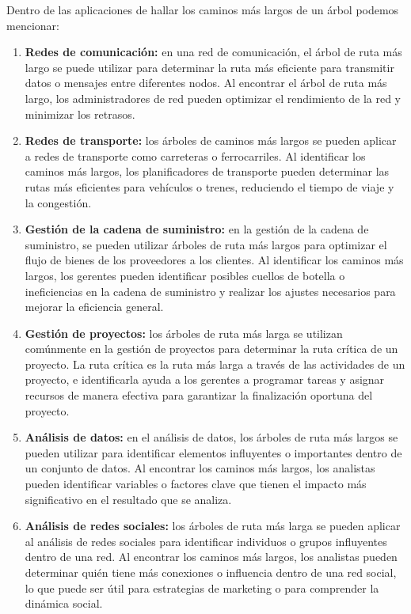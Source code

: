 Dentro de las aplicaciones de hallar los caminos más largos de un árbol podemos mencionar:

\begin{enumerate}
	\item \textbf{ Redes de comunicación:} en una red de comunicación, el árbol de ruta más largo se puede utilizar para determinar la ruta más eficiente para transmitir datos o mensajes entre diferentes nodos. Al encontrar el árbol de ruta más largo, los administradores de red pueden optimizar el rendimiento de la red y minimizar los retrasos.
	\item \textbf{Redes de transporte:} los árboles de caminos más largos se pueden aplicar a redes de transporte como carreteras o ferrocarriles. Al identificar los caminos más largos, los planificadores de transporte pueden determinar las rutas más eficientes para vehículos o trenes, reduciendo el tiempo de viaje y la congestión.
	\item  \textbf{Gestión de la cadena de suministro:} en la gestión de la cadena de suministro, se pueden utilizar árboles de ruta más largos para optimizar el flujo de bienes de los proveedores a los clientes. Al identificar los caminos más largos, los gerentes pueden identificar posibles cuellos de botella o ineficiencias en la cadena de suministro y realizar los ajustes necesarios para mejorar la eficiencia general.
	\item \textbf{Gestión de proyectos:} los árboles de ruta más larga se utilizan comúnmente en la gestión de proyectos para determinar la ruta crítica de un proyecto. La ruta crítica es la ruta más larga a través de las actividades de un proyecto, e identificarla ayuda a los gerentes a programar tareas y asignar recursos de manera efectiva para garantizar la finalización oportuna del proyecto.
	\item  \textbf{Análisis de datos:} en el análisis de datos, los árboles de ruta más largos se pueden utilizar para identificar elementos influyentes o importantes dentro de un conjunto de datos. Al encontrar los caminos más largos, los analistas pueden identificar variables o factores clave que tienen el impacto más significativo en el resultado que se analiza.
	\item \textbf{Análisis de redes sociales:} los árboles de ruta más larga se pueden aplicar al análisis de redes sociales para identificar individuos o grupos influyentes dentro de una red. Al encontrar los caminos más largos, los analistas pueden determinar quién tiene más conexiones o influencia dentro de una red social, lo que puede ser útil para estrategias de marketing o para comprender la dinámica social.

\end{enumerate}
